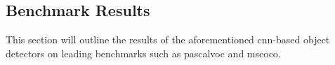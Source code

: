 \subsection{Benchmark Results}

This section will outline the results of the aforementioned \gls{cnn}-based object detectors on leading benchmarks such as \gls{pascalvoc} and \gls{mscoco}.